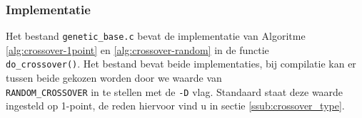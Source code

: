 

\subsubsection{Implementatie}
Het bestand \texttt{genetic\_base.c} bevat de implementatie van Algoritme \ref{alg:crossover-1point} en \ref{alg:crossover-random} in de functie 
\\ \texttt{do\_crossover()}. 
Het bestand bevat beide implementaties, bij compilatie kan er tussen beide gekozen worden door we waarde van \\ \texttt{RANDOM\_CROSSOVER} in te stellen met de \texttt{-D} vlag. Standaard staat deze waarde ingesteld op 1-point, de reden hiervoor vind u in sectie \ref{ssub:crossover_type}.


%